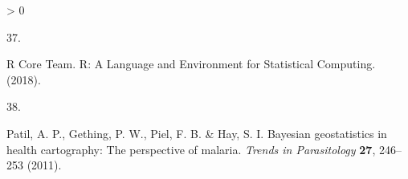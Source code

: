 \documentclass[
]{article}
\newlength{\cslhangindent}
\newlength{\csllabelwidth}
\newenvironment{CSLReferences}[2] %
 {%
  \setlength{\parindent}{0pt}
  \ifodd #1 \everypar{\setlength{\hangindent}{\cslhangindent}}\ignorespaces\fi
  \ifnum #2 > 0
  \setlength{\parskip}{#2\baselineskip}
  \fi
 }%
 {}
\newcommand{\CSLLeftMargin}[1]{\parbox[t]{\csllabelwidth}{#1}}
\newcommand{\CSLRightInline}[1]{\parbox[t]{\linewidth - \csllabelwidth}{#1}\break}
\begin{document}
\begin{CSLReferences}{0}{0}
\leavevmode\hypertarget{ref-RCoreTeam2018}{}%
\CSLLeftMargin{37. }
\CSLRightInline{R Core Team. {R: A Language and Environment for Statistical Computing}. (2018).}

\leavevmode\hypertarget{ref-Patil2011}{}%
\CSLLeftMargin{38. }
\CSLRightInline{Patil, A. P., Gething, P. W., Piel, F. B. \& Hay, S. I. {Bayesian geostatistics in health cartography: The perspective of malaria}. \emph{Trends in Parasitology} \textbf{27}, 246--253 (2011).}

\end{CSLReferences}
\end{document}
